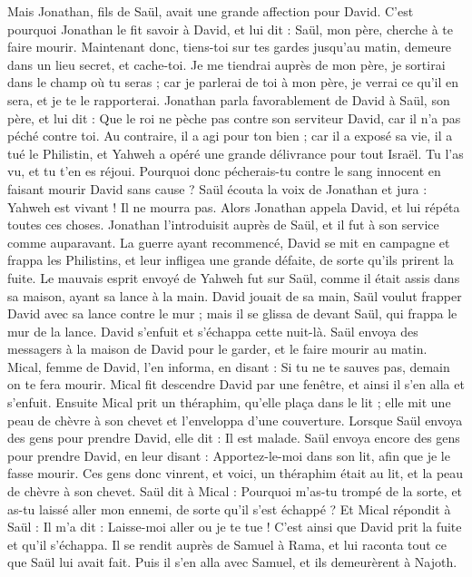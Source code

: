 \begin{multicols}{2}
Mais Jonathan, fils de Saül, avait une grande affection pour David. C'est pourquoi Jonathan le fit savoir à David, et lui dit : Saül, mon père, cherche à te faire mourir. Maintenant donc, tiens-toi sur tes gardes jusqu'au matin, demeure dans un lieu secret, et cache-toi.
Je me tiendrai auprès de mon père, je sortirai dans le champ où tu seras ; car je parlerai de toi à mon père, je verrai ce qu'il en sera, et je te le rapporterai.
Jonathan parla favorablement de David à Saül, son père, et lui dit : Que le roi ne pèche pas contre son serviteur David, car il n'a pas péché contre toi. Au contraire, il a agi pour ton bien ;
car il a exposé sa vie, il a tué le Philistin, et Yahweh a opéré une grande délivrance pour tout Israël. Tu l'as vu, et tu t'en es réjoui. Pourquoi donc pécherais-tu contre le sang innocent en faisant mourir David sans cause ?
Saül écouta la voix de Jonathan et jura : Yahweh est vivant ! Il ne mourra pas.
Alors Jonathan appela David, et lui répéta toutes ces choses. Jonathan l’introduisit auprès de Saül, et il fut à son service comme auparavant.
La guerre ayant recommencé, David se mit en campagne et frappa les Philistins, et leur infligea une grande défaite, de sorte qu'ils prirent la fuite.
Le mauvais esprit envoyé de Yahweh fut sur Saül, comme il était assis dans sa maison, ayant sa lance à la main. David jouait de sa main,
Saül voulut frapper David avec sa lance contre le mur ; mais il se glissa de devant Saül, qui frappa le mur de la lance. David s'enfuit et s'échappa cette nuit-là.
Saül envoya des messagers à la maison de David pour le garder, et le faire mourir au matin. Mical, femme de David, l’en informa, en disant : Si tu ne te sauves pas, demain on te fera mourir.
Mical fit descendre David par une fenêtre, et ainsi il s'en alla et s'enfuit.
Ensuite Mical prit un théraphim, qu’elle plaça dans le lit ; elle mit une peau de chèvre à son chevet et l’enveloppa d'une couverture.
Lorsque Saül envoya des gens pour prendre David, elle dit : Il est malade.
Saül envoya encore des gens pour prendre David, en leur disant : Apportez-le-moi dans son lit, afin que je le fasse mourir.
Ces gens donc vinrent, et voici, un théraphim était au lit, et la peau de chèvre à son chevet.
Saül dit à Mical : Pourquoi m'as-tu trompé de la sorte, et as-tu laissé aller mon ennemi, de sorte qu'il s’est échappé ? Et Mical répondit à Saül : Il m'a dit : Laisse-moi aller ou je te tue !
C’est ainsi que David prit la fuite et qu’il s’échappa. Il se rendit auprès de Samuel à Rama, et lui raconta tout ce que Saül lui avait fait. Puis il s'en alla avec Samuel, et ils demeurèrent à Najoth.

\end{multicols}
